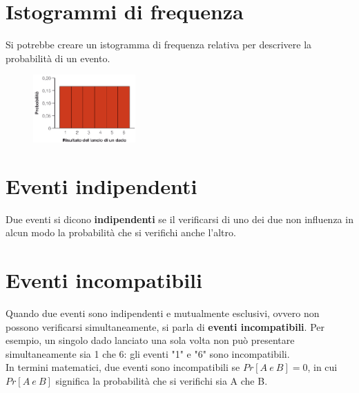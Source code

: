 \documentclass[10pt, draft]{book}
\begin{document}
\section{Istogrammi di frequenza}
Si potrebbe creare un istogramma di frequenza relativa per descrivere la probabilità di un evento.
\begin{figure}[h]\label{fig5.4-1}
    \centering
    \includegraphics[width=0.35\textwidth]{fig5.4-1}
    \caption{\small{}}
\end{figure}

\section{Eventi indipendenti}
Due eventi si dicono \textbf{indipendenti} se il verificarsi di uno dei due non influenza in alcun modo la probabilità che si verifichi anche l'altro.

\section{Eventi incompatibili}
Quando due eventi sono indipendenti e mutualmente esclusivi, ovvero non possono verificarsi simultaneamente, si parla di \textbf{eventi incompatibili}. Per esempio, un singolo dado lanciato una sola volta non può presentare simultaneamente sia 1 che 6: gli eventi "1" e "6" sono incompatibili.
\\
In termini matematici, due eventi sono incompatibili se $Pr[A\ e\ B]=0$, in cui $Pr[A\ e\ B]$ significa la probabilità che si verifichi sia A che B.
\end{document}
